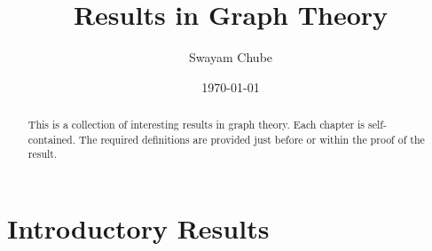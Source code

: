 \documentclass[12pt]{report}
\title{Results in Graph Theory}
\author{Swayam Chube}
\date{\today}
\begin{document}
    \maketitle
    \begin{abstract}
        This is a collection of interesting results in graph theory. Each chapter is self-contained. The required definitions are provided just before or within the proof of the result.
    \end{abstract}
    \tableofcontents

    \chapter{Introductory Results}
    
\end{document}
